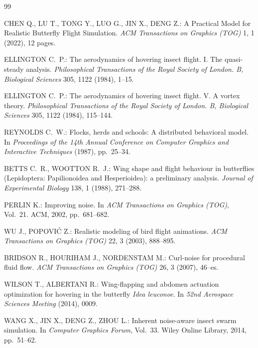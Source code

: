 \documentclass[12pt]{article}
\begin{document}
\begin{thebibliography}{99}

CHEN Q., LU T., TONG Y., LUO G., JIN X., DENG Z.:
A Practical Model for Realistic Butterfly Flight Simulation.
\textit{ACM Transactions on Graphics (TOG)} 1, 1 (2022), 12 pages.

ELLINGTON C.~P.:
The aerodynamics of hovering insect flight. I. The quasi-steady analysis.
\textit{Philosophical Transactions of the Royal Society of London. B,
Biological Sciences} 305, 1122 (1984), 1--15.

ELLINGTON C.~P.:
The aerodynamics of hovering insect flight. V. A vortex theory.
\textit{Philosophical Transactions of the Royal Society of London. B,
Biological Sciences} 305, 1122 (1984), 115--144.

REYNOLDS C.~W.:
Flocks, herds and schools: A distributed behavioral model.
In \textit{Proceedings of the 14th Annual Conference on Computer Graphics
and Interactive Techniques} (1987), pp.~25--34.

BETTS C.~R., WOOTTON R.~J.:
Wing shape and flight behaviour in butterflies (Lepidoptera: Papilionoidea
and Hesperioidea): a preliminary analysis.
\textit{Journal of Experimental Biology} 138, 1 (1988), 271--288.

PERLIN K.:
Improving noise.
In \textit{ACM Transactions on Graphics (TOG)}, Vol.~21.
ACM, 2002, pp.~681--682.

WU J., POPOVI\'C Z.:
Realistic modeling of bird flight animations.
\textit{ACM Transactions on Graphics (TOG)} 22, 3 (2003), 888--895.

BRIDSON R., HOURIHAM J., NORDENSTAM M.:
Curl-noise for procedural fluid flow.
\textit{ACM Transactions on Graphics (TOG)} 26, 3 (2007), 46--es.

WILSON T., ALBERTANI R.:
Wing-flapping and abdomen actuation optimization for hovering in the
butterfly \textit{Idea leuconoe}.
In \textit{52nd Aerospace Sciences Meeting} (2014), 0009.

WANG X., JIN X., DENG Z., ZHOU L.:
Inherent noise-aware insect swarm simulation.
In \textit{Computer Graphics Forum}, Vol.~33.
Wiley Online Library, 2014, pp.~51--62.


\end{thebibliography}
\end{document}
